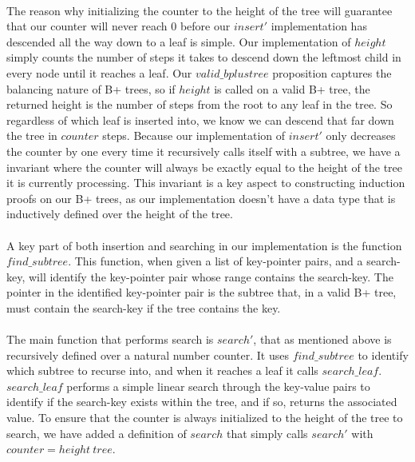 \paragraph{}
The reason why initializing the counter to the height of the tree will guarantee that our counter will never reach $0$ before our $insert'$ implementation has descended all the way down to a leaf is simple. Our implementation of $height$ simply counts the number of steps it takes to descend down the leftmost child in every node until it reaches a leaf. Our $valid\_bplustree$ proposition captures the balancing nature of B+ trees, so if $height$ is called on a valid B+ tree, the returned height is the number of steps from the root to any leaf in the tree. So regardless of which leaf is inserted into, we know we can descend that far down the tree in $counter$ steps. Because our implementation of $insert'$ only decreases the counter by one every time it recursively calls itself with a subtree, we have a invariant where the counter will always be exactly equal to the height of the tree it is currently processing. This invariant is a key aspect to constructing induction proofs on our B+ trees, as our implementation doesn't have a data type that is inductively defined over the height of the tree.

\paragraph{}
A key part of both insertion and searching in our implementation is the function $find\_subtree$. This function, when given a list of key-pointer pairs, and a search-key, will identify the key-pointer pair whose range contains the search-key. The pointer in the identified key-pointer pair is the subtree that, in a valid B+ tree, must contain the search-key if the tree contains the key.

\paragraph{}
The main function that performs search is $search'$, that as mentioned above is recursively defined over a natural number counter. It uses $find\_subtree$ to identify which subtree to recurse into, and when it reaches a leaf it calls $search\_leaf$. $search\_leaf$ performs a simple linear search through the key-value pairs to identify if the search-key exists within the tree, and if so, returns the associated value. To ensure that the counter is always initialized to the height of the tree to search, we have added a definition of $search$ that simply calls $search'$ with $counter = height~tree$.

